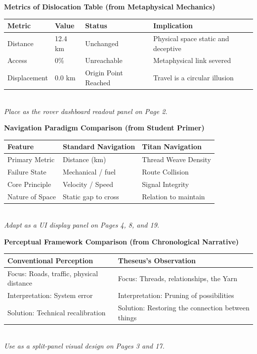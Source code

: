 \documentclass[11pt]{article}
\begin{document}
\begin{archivebox}
\textcolor{archiveGold}{\textbf{Metrics of Dislocation Table (from Metaphysical Mechanics)}}\\[4pt]
\small
\begin{tabular}{llll}
\toprule
Metric & Value & Status & Implication \\
\midrule
Distance & 12.4 km & Unchanged & Physical space static and deceptive \\
Access & 0\% & Unreachable & Metaphysical link severed \\
Displacement & 0.0 km & Origin Point Reached & Travel is a circular illusion \\
\bottomrule
\end{tabular}\\[4pt]
\textit{Place as the rover dashboard readout panel on Page 2.}
\end{archivebox}

\begin{archivebox}
\textcolor{archiveGold}{\textbf{Navigation Paradigm Comparison (from Student Primer)}}\\[4pt]
\small
\begin{tabular}{lll}
\toprule
Feature & Standard Navigation & Titan Navigation \\
\midrule
Primary Metric & Distance (km) & Thread Weave Density \\
Failure State & Mechanical / fuel & Route Collision \\
Core Principle & Velocity / Speed & Signal Integrity \\
Nature of Space & Static gap to cross & Relation to maintain \\
\bottomrule
\end{tabular}\\[4pt]
\textit{Adapt as a UI display panel on Pages 4, 8, and 19.}
\end{archivebox}

\begin{archivebox}
\textcolor{archiveGold}{\textbf{Perceptual Framework Comparison (from Chronological Narrative)}}\\[4pt]
\small
\begin{tabular}{ll}
\toprule
Conventional Perception & Theseus's Observation \\
\midrule
Focus: Roads, traffic, physical distance & Focus: Threads, relationships, the Yarn \\
Interpretation: System error & Interpretation: Pruning of possibilities \\
Solution: Technical recalibration & Solution: Restoring the connection between things \\
\bottomrule
\end{tabular}\\[4pt]
\textit{Use as a split-panel visual design on Pages 3 and 17.}
\end{archivebox}
\end{document}
